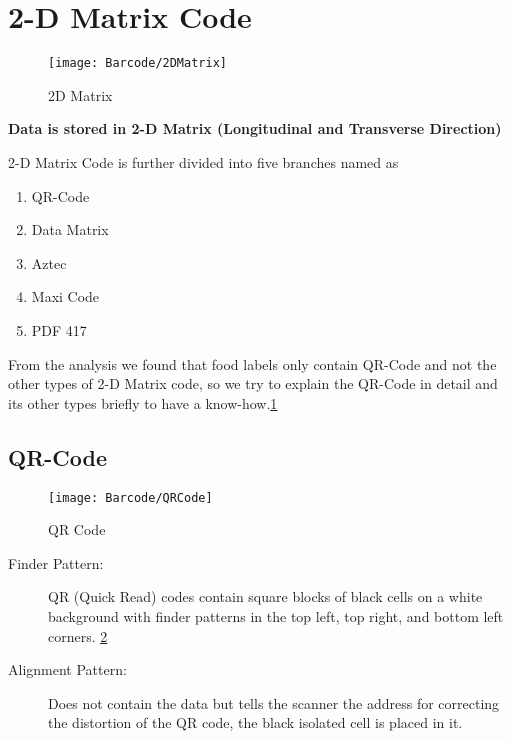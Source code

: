 \section{2-D Matrix Code}

\begin{figure}
	\begin{center}
		\texttt{[image: Barcode/2DMatrix]}
		\caption{2D Matrix}\label{2D Matrix}
	\end{center}
\end{figure}

\textbf{Data is stored in 2-D Matrix (Longitudinal and Transverse Direction)}

2-D Matrix Code is further divided into five branches named as

\begin{enumerate}
	\item QR-Code
	\item Data Matrix 
	\item Aztec 
	\item Maxi Code
	\item PDF 417	
\end{enumerate}

From the analysis we found that food labels only contain QR-Code and not the other types of 2-D Matrix code, so we try to explain the QR-Code in detail and its other types briefly to have a know-how.\ref{2D Matrix}

\subsection{QR-Code}

\begin{figure}
	\begin{center}
		\texttt{[image: Barcode/QRCode]}
		\caption{QR Code}\label{QR Code}
	\end{center}
\end{figure}

\begin{description}
	\item [Finder Pattern:] 
	QR (Quick Read) codes contain square blocks of black cells on a white background with finder patterns in the top left, top right, and bottom left corners. \ref{QR Code}
\end{description}

\begin{description}
	\item [Alignment Pattern:]
	Does not contain the data but tells the scanner the address for correcting the distortion of the QR code, the black isolated cell is placed in it.
\end{description}

